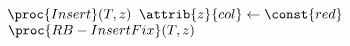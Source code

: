 \begin{codebox}
\li $\proc{Insert}(T,z)$
\li $\attrib{z}{col} \gets \const{red}$
\li $\proc{RB-InsertFix}(T,z)$
\end{codebox}